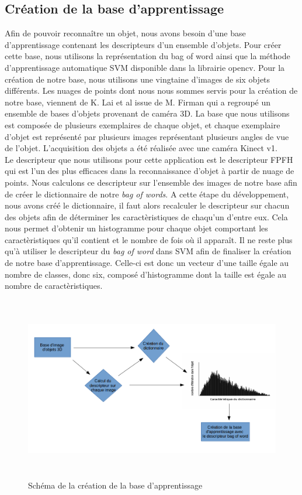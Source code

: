 \subsection{Création de la base d'apprentissage}
Afin de pouvoir reconnaître un objet, nous avons besoin d'une base d'apprentissage contenant les descripteurs d'un ensemble
d'objets. Pour créer cette base, nous utilisons la représentation du \og bag of word \fg ainsi que la méthode d'apprentissage 
automatique SVM\cite{SVM} disponible dans la librairie opencv. Pour la création de notre base, nous utilisons une vingtaine
d'images de six objets différents. Les nuages de points dont nous nous sommes servis pour la création de notre base, viennent de 
K. Lai et al\cite{Base1} issue de M. Firman\cite{generalBase} qui a regroupé un ensemble de bases d'objets provenant de caméra 3D.
La base que nous utilisons est composée de plusieurs exemplaires de chaque objet, et chaque exemplaire d'objet est représenté par 
plusieurs images représentant plusieurs angles de vue de l'objet. L'acquisition des objets a été réalisée avec une caméra 
Kinect v1.\\

Le descripteur que nous utilisons pour cette application est le descripteur FPFH\cite{FPFH} qui est l'un des plus efficaces dans la
reconnaissance d'objet à partir de nuage de points. Nous calculons ce descripteur sur l'ensemble des images de notre base afin de
créer le dictionnaire de notre \textit{bag of words}. A cette étape du développement, nous avons créé le dictionnaire, il faut
alors recalculer le descripteur sur chacun des objets afin de déterminer les caractèristiques de chaqu'un d'entre eux. Cela nous
permet d'obtenir un histogramme pour chaque objet comportant les caractèristiques qu'il contient et le nombre de fois où il
apparaît. Il ne reste plus qu'à utiliser le descripteur du \textit{bag of word} dans SVM afin de finaliser la création de 
notre base d'apprentissage. Celle-ci est donc un vecteur d'une taille égale au nombre de classes, donc six, 
composé d'histogramme dont la taille est égale au nombre de caractèristiques.

\begin{figure}[!ht]
  \begin{center}
    \includegraphics[height=8cm]{image/schemaBase.png}
    \caption{Schéma de la création de la base d'apprentissage}
  \end{center}
\end{figure}

